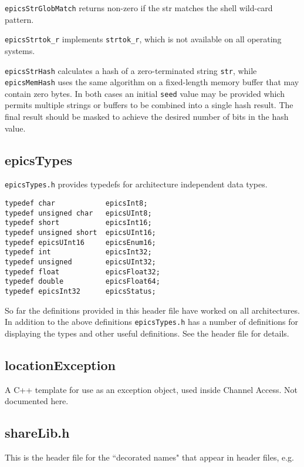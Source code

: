 \verb|epicsStrGlobMatch| returns non-zero if the str matches the shell wild-card pattern.

\verb|epicsStrtok_r| implements \verb|strtok_r|, which is not available on all operating systems.

\verb|epicsStrHash| calculates a hash of a zero-terminated string \verb|str|, while \verb|epicsMemHash| uses the same algorithm on a fixed-length memory buffer that may contain zero bytes.
In both cases an initial \verb|seed| value may be provided which permits multiple strings or buffers to be combined into a single hash result.
The final result should be masked to achieve the desired number of bits in the hash value.

\subsection{epicsTypes}

\verb|epicsTypes.h| provides typedefs for architecture independent data types.

\begin{verbatim}
typedef char            epicsInt8;
typedef unsigned char   epicsUInt8;
typedef short           epicsInt16;
typedef unsigned short  epicsUInt16;
typedef epicsUInt16     epicsEnum16;
typedef int             epicsInt32;
typedef unsigned        epicsUInt32;
typedef float           epicsFloat32;
typedef double          epicsFloat64;
typedef epicsInt32      epicsStatus;
\end{verbatim}

So far the definitions provided in this header file have worked on all architectures.
In addition to the above definitions \verb|epicsTypes.h| has a number of definitions for displaying the types and other useful definitions.
See the header file for details.

\subsection{locationException}

A C++ template for use as an exception object, used inside Channel Access.
Not documented here.

\subsection{shareLib.h}

This is the header file for the ``decorated names" that appear in header files, e.g.

